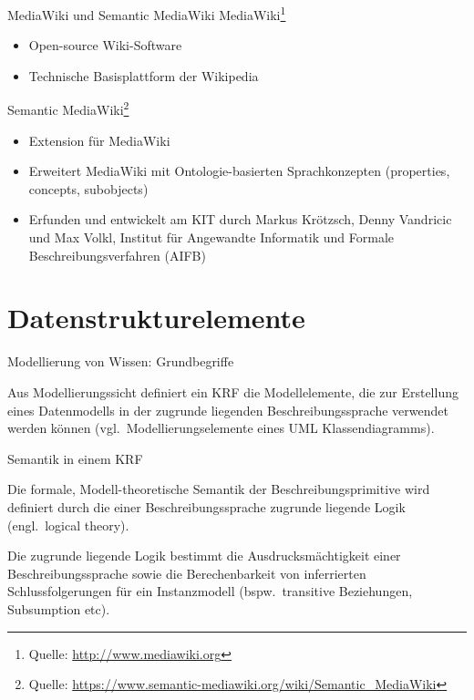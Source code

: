 \documentclass[aspectratio=1610,onlymath]{beamer}
\begin{document}
\begin{frame}{MediaWiki und Semantic MediaWiki}
	\alert{MediaWiki}\footnote{Quelle: \url{http://www.mediawiki.org}}
	\begin{itemize}
		\item Open-source Wiki-Software
		\item Technische Basisplattform der Wikipedia
	\end{itemize}
	\bigskip
	
	\alert{Semantic MediaWiki}\footnote{Quelle: \url{https://www.semantic-mediawiki.org/wiki/Semantic_MediaWiki}}
	\begin{itemize}
		\item Extension für MediaWiki
		\item Erweitert MediaWiki mit Ontologie-basierten Sprachkonzepten (\alert{properties}, \alert{concepts}, \alert{subobjects})
		\item Erfunden und entwickelt am KIT durch Markus Krötzsch, Denny Vandricic und Max Volkl, Institut für Angewandte Informatik und Formale Beschreibungsverfahren (AIFB)
	\end{itemize}
	
\end{frame}

\section{Datenstrukturelemente} %
\label{sec:datenstrukturelemente}

\begin{frame}{Modellierung von Wissen: Grundbegriffe}


\bigskip
Aus Modellierungssicht definiert ein KRF die Modellelemente, die zur Erstellung eines Datenmodells in der zugrunde liegenden Beschreibungssprache verwendet werden können (vgl.\ Modellierungselemente eines UML Klassendiagramms).

\bigskip
\alert{Semantik in einem KRF}

Die formale, Modell-theoretische Semantik der Beschreibungsprimitive wird definiert durch die einer Beschreibungssprache zugrunde liegende Logik (engl.\ logical theory).


Die zugrunde liegende Logik bestimmt die Ausdrucksmächtigkeit einer Beschreibungssprache sowie die Berechenbarkeit von inferrierten Schlussfolgerungen für ein Instanzmodell (bspw.\ transitive Beziehungen, Subsumption etc).

\end{frame}
\end{document}
